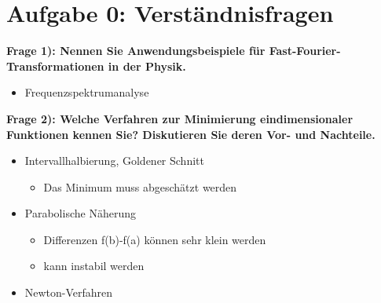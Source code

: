 \section*{Aufgabe 0: Verständnisfragen}
\textbf{Frage 1): Nennen Sie Anwendungsbeispiele für Fast-Fourier-Transformationen in der Physik.}\\

  \begin{itemize}
    \item Frequenzspektrumanalyse
  \end{itemize}


\textbf{Frage 2):  Welche Verfahren zur Minimierung eindimensionaler Funktionen kennen Sie? Diskutieren Sie
deren Vor- und Nachteile.}\\



  \begin{itemize}
    \item Intervallhalbierung, Goldener Schnitt
    \begin{itemize}
      \item Das Minimum muss abgeschätzt werden
    \end{itemize}
    \item Parabolische Näherung
    \begin{itemize}
      \item Differenzen f(b)-f(a) können sehr klein werden
      \item kann instabil werden
    \end{itemize}
    \item Newton-Verfahren
  \end{itemize}
